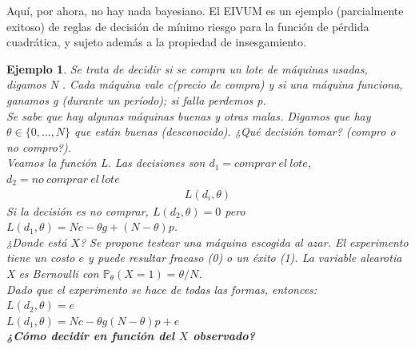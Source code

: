 \documentclass[10pt]{article}
\theoremstyle{plain}
\newtheorem{ej}{Ejemplo}
\theoremstyle{definition}
\begin{document}
Aquí, por ahora, no hay nada bayesiano. El EIVUM es un ejemplo (parcialmente exitoso) de reglas de decisión de mínimo riesgo para la función de pérdida cuadrática, y sujeto además a la propiedad de insesgamiento.

\begin{ej} Se trata de decidir si se compra un lote de máquinas usadas, digamos N . Cada máquina vale c(precio de compra) y si una máquina funciona, ganamos g (durante un período); si falla perdemos p.\\
Se sabe que hay algunas máquinas buenas y otras malas. Digamos que hay $\theta \in \{0,\ldots,N\}$ que están buenas (desconocido). ¿Qué decisión tomar? (compro o no compro?).\\
Veamos la función L. Las decisiones son $d_{1} = comprar\ el\ lote$, $d_{2} = no\ comprar\ el\ lote$
\begin{align*}
L(d_{i},\theta) 
\end{align*}
Si la decisión es no comprar, $L(d_{2},\theta) = 0$ pero $L(d_{1},\theta) = Nc - \theta g + (N-\theta)p$.\\

¿Donde está $X$? Se propone testear una máquina escogida al azar. El experimento tiene un costo $e$ y puede resultar fracaso (0) o un éxito (1). La variable alearotia  X es Bernoulli con $\mathbb{P}_{\theta}(X=1) = \theta/N$.\\

Dado que el experimento se hace de todas las formas, entonces:\\
$L(d_{2},\theta) = e$\\
$L(d_{1},\theta) = Nc-\theta g (N-\theta)p + e$\\

\textbf{¿Cómo decidir en función del $X$ observado?}\\


\end{ej}
\end{document}
